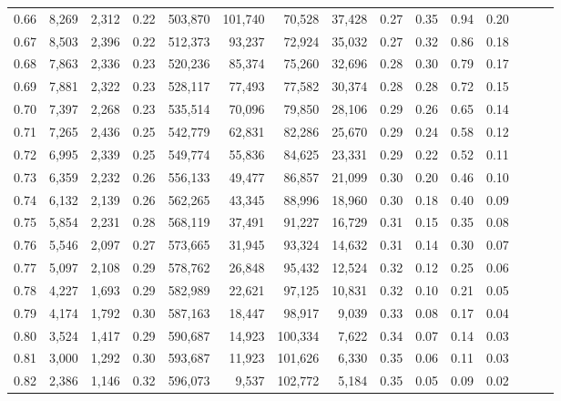 \begin{tabular}{rrrrrrrrrrrrrrr}
0.66 &   8,269 &  2,312 &  0.22 &  503,870 &  101,740 &   70,528 &   37,428 &  0.27 &  0.35 &  0.94 &      0.20 \\
0.67 &   8,503 &  2,396 &  0.22 &  512,373 &   93,237 &   72,924 &   35,032 &  0.27 &  0.32 &  0.86 &      0.18 \\
0.68 &   7,863 &  2,336 &  0.23 &  520,236 &   85,374 &   75,260 &   32,696 &  0.28 &  0.30 &  0.79 &      0.17 \\
0.69 &   7,881 &  2,322 &  0.23 &  528,117 &   77,493 &   77,582 &   30,374 &  0.28 &  0.28 &  0.72 &      0.15 \\
0.70 &   7,397 &  2,268 &  0.23 &  535,514 &   70,096 &   79,850 &   28,106 &  0.29 &  0.26 &  0.65 &      0.14 \\
0.71 &   7,265 &  2,436 &  0.25 &  542,779 &   62,831 &   82,286 &   25,670 &  0.29 &  0.24 &  0.58 &      0.12 \\
0.72 &   6,995 &  2,339 &  0.25 &  549,774 &   55,836 &   84,625 &   23,331 &  0.29 &  0.22 &  0.52 &      0.11 \\
0.73 &   6,359 &  2,232 &  0.26 &  556,133 &   49,477 &   86,857 &   21,099 &  0.30 &  0.20 &  0.46 &      0.10 \\
0.74 &   6,132 &  2,139 &  0.26 &  562,265 &   43,345 &   88,996 &   18,960 &  0.30 &  0.18 &  0.40 &      0.09 \\
0.75 &   5,854 &  2,231 &  0.28 &  568,119 &   37,491 &   91,227 &   16,729 &  0.31 &  0.15 &  0.35 &      0.08 \\
0.76 &   5,546 &  2,097 &  0.27 &  573,665 &   31,945 &   93,324 &   14,632 &  0.31 &  0.14 &  0.30 &      0.07 \\
0.77 &   5,097 &  2,108 &  0.29 &  578,762 &   26,848 &   95,432 &   12,524 &  0.32 &  0.12 &  0.25 &      0.06 \\
0.78 &   4,227 &  1,693 &  0.29 &  582,989 &   22,621 &   97,125 &   10,831 &  0.32 &  0.10 &  0.21 &      0.05 \\
0.79 &   4,174 &  1,792 &  0.30 &  587,163 &   18,447 &   98,917 &    9,039 &  0.33 &  0.08 &  0.17 &      0.04 \\
0.80 &   3,524 &  1,417 &  0.29 &  590,687 &   14,923 &  100,334 &    7,622 &  0.34 &  0.07 &  0.14 &      0.03 \\
0.81 &   3,000 &  1,292 &  0.30 &  593,687 &   11,923 &  101,626 &    6,330 &  0.35 &  0.06 &  0.11 &      0.03 \\
0.82 &   2,386 &  1,146 &  0.32 &  596,073 &    9,537 &  102,772 &    5,184 &  0.35 &  0.05 &  0.09 &      0.02 \\

\end{tabular}
